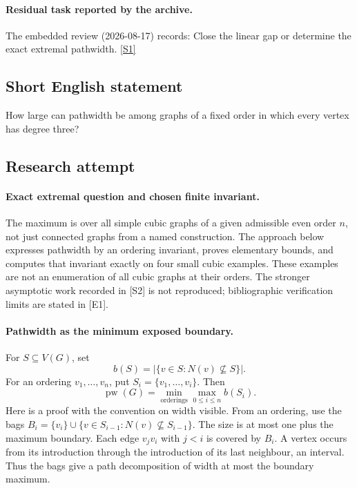 \documentclass[11pt,a4paper]{article}
\newcommand{\sref}[2]{\hyperlink{source:#1:#2}{[S#2]}}
\begin{document}
\paragraph{Residual task reported by the archive.}

The embedded review (2026-08-17) records: Close the linear gap or determine the exact extremal pathwidth. \sref{1422}{1}

\subsection{Short English statement}

How large can pathwidth be among graphs of a fixed order in which every vertex has degree three?

\subsection{Research attempt}

\paragraph{Exact extremal question and chosen finite invariant.}
The maximum is over all simple cubic graphs of a given admissible even
order $n$, not just connected graphs from a named construction. The
approach below expresses pathwidth by an ordering invariant, proves
elementary bounds, and computes that invariant exactly on four small
cubic examples. These examples are not an enumeration of all cubic
graphs at their orders. The stronger asymptotic work recorded in [S2]
is not reproduced; bibliographic verification limits are stated in [E1].

\paragraph{Pathwidth as the minimum exposed boundary.}
For $S\subseteq V(G)$, set
\[
              b(S)=|\{v\in S:N(v)\not\subseteq S\}|.
\]
For an ordering $v_1,\ldots,v_n$, put $S_i=\{v_1,\ldots,v_i\}$.
Then
\[
          \operatorname{pw}(G)=\min_{\text{orderings}}\max_{0\le i\le n}b(S_i).
\]
Here is a proof with the convention on width visible. From an ordering,
use the bags
$B_i=\{v_i\}\cup\{v\in S_{i-1}:N(v)\not\subseteq S_{i-1}\}$.
The size is at most one plus the maximum boundary. Each edge $v_jv_i$
with $j<i$ is covered by $B_i$. A vertex occurs from its introduction
through the introduction of its last neighbour, an interval. Thus the
bags give a path decomposition of width at most the boundary maximum.
\end{document}
